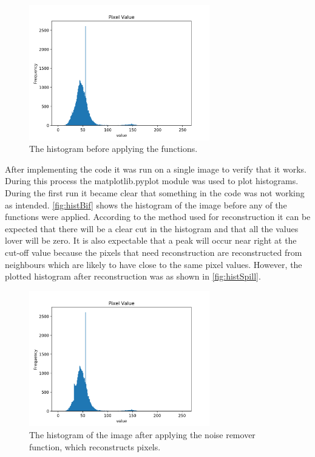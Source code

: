 \begin{figure}[h]
\centering
\includegraphics[width=0.7\textwidth]{figures/hist_before.png}
\caption{The histogram before applying the functions.}
\label{fig:histBif}
\end{figure}
\noindent
After implementing the code it was run on a single image to verify that it works. During this process the matplotlib.pyplot module was used to plot histograms. During the first run it became clear that something in the code was not working as intended. \autoref{fig:histBif} shows the histogram of the image before any of the functions were applied. According to the method used for reconstruction it can be expected that there will be a clear cut in the histogram and that all the values lover will be zero. It is also expectable that a peak will occur near right at the cut-off value because the pixels that need reconstruction are reconstructed from neighbours which are likely to have close to the same pixel values. However, the plotted histogram after reconstruction was as shown in \autoref{fig:histSpill}.
\begin{figure}[h]
\centering
\includegraphics[width=0.7\textwidth]{figures/hist_spill.png}
\caption{The histogram of the image after applying the noise remover function, which reconstructs pixels.}
\label{fig:histSpill}
\end{figure}
